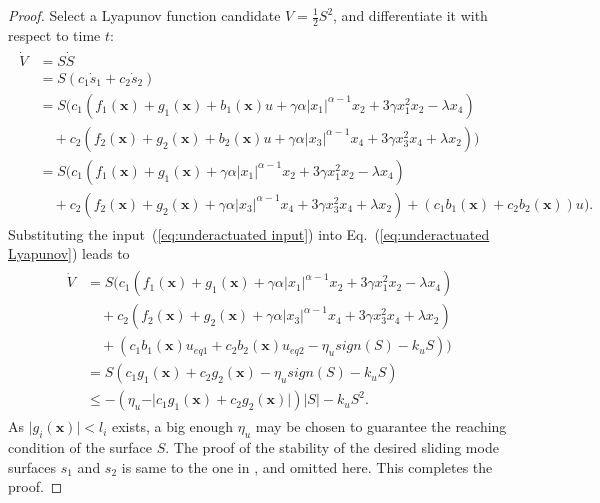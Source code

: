 \documentclass[3p]{elsarticle}
\theoremstyle{plain}
\theoremstyle{remark}
\begin{document}
\begin{proof}
Select a Lyapunov function candidate $V=\frac{1}{2}S^2$, and differentiate it with respect to time $t$:
\begin{align}
\begin{split}
\dot V &= S\dot S\\ &= S(c_1\dot s_1+c_2\dot s_2)\\
&=S(c_1(f_1(\bm x)+g_1(\bm x)+b_1(\bm x)u+\gamma\alpha\vert x_1\vert^{\alpha-1}x_2+3\gamma x_1^2x_2-\lambda x_4)\\
&\quad+c_2(f_2(\bm x)+g_2(\bm x)+b_2(\bm x)u+\gamma\alpha\vert x_3\vert^{\alpha-1}x_4+3\gamma x_3^2x_4+\lambda x_2))\\
&=S(c_1(f_1(\bm x)+g_1(\bm x)+\gamma\alpha\vert x_1\vert^{\alpha-1}x_2+3\gamma x_1^2x_2-\lambda x_4)\\
&\quad+c_2(f_2(\bm x)+g_2(\bm x)+\gamma\alpha\vert x_3\vert^{\alpha-1}x_4+3\gamma x_3^2x_4+\lambda x_2)+(c_1b_1(\bm x)+c_2b_2(\bm x))u).\label{eq:underactuated Lyapunov}
\end{split}
\end{align}
Substituting the input~(\ref{eq:underactuated input}) into Eq.~(\ref{eq:underactuated Lyapunov}) leads to
\begin{align}
\begin{split}
\dot V &= S(c_1(f_1(\bm x)+g_1(\bm x)+\gamma\alpha\vert x_1\vert^{\alpha-1}x_2+3\gamma x_1^2x_2-\lambda x_4)\\
&\quad+c_2(f_2(\bm x)+g_2(\bm x)+\gamma\alpha\vert x_3\vert^{\alpha-1}x_4+3\gamma x_3^2x_4+\lambda x_2)\\
&\quad+(c_1b_1(\bm x)u_{eq1}+c_2b_2(\bm x)u_{eq2}-\eta_u sign(S)-k_u S))\\
&= S(c_1g_1(\bm x)+c_2g_2(\bm x)-\eta_u sign(S)-k_u S)\\
&\le -(\eta_u -\vert c_1g_1(\bm x)+c_2g_2(\bm x)\vert)\vert S\vert-k_u S^2.
\end{split}
\end{align}
As $\vert g_i(\bm x)\vert<l_i$ exists, a big enough $\eta_u$ may be chosen to guarantee the reaching condition of the surface $S$. The proof of the stability of the desired sliding mode  surfaces $s_1$ and $s_2$ is same to the one in \cite{wang2004design}, and omitted here. This completes the proof.
\end{proof}
\end{document}
